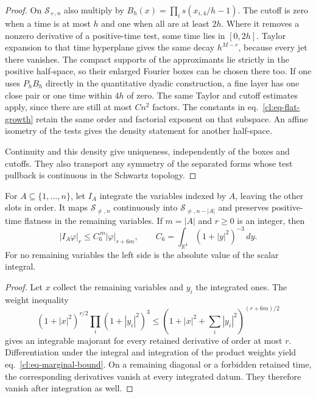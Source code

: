 \documentclass[11pt,letterpaper,reqno]{amsart}
\makeatletter
\numberwithin{equation}{section}
\renewcommand{\eqref}[1]{\textup{eq.~\ref{#1}}}
\theoremstyle{definition}
\newcommand{\ms@minorstart}{%
  \pushQED{\qed}\renewcommand{\qedsymbol}{$\blacksquare$}}
\newenvironment{lemma}[1][]{\ms@minorstart\ms@lemma[#1]}
  {\popQED\endms@lemma}
\theoremstyle{remark}
\makeatother
\begin{document}
\begin{proof}
On \(\mathcal S_{+,n}\) also multiply by
\(B_h(x)=\prod_i s(x_{i,4}/h-1)\).
The cutoff is zero when a time is at most \(h\) and one when
all are at least \(2h\). Where it removes a nonzero derivative
of a positive-time test, some time lies in \([0,2h]\).
Taylor expansion to that time hyperplane gives the same
decay \(h^{M-r}\), because every jet there vanishes.
The compact supports of the approximants lie strictly in
the positive half-space, so their enlarged Fourier boxes
can be chosen there too. If one uses \(P_hB_h\) directly
in the quantitative dyadic construction, a fine layer has
one close pair or one time within \(4h\) of zero.
The same Taylor and cutoff estimates apply, since there
are still at most \(Cn^2\) factors. The constants in
\eqref{cl:eq-flat-growth} retain the same order and factorial
exponent on that subspace. An affine isometry of the tests
gives the density statement for another half-space.

Continuity and this density give uniqueness, independently
of the boxes and cutoffs. They also transport any symmetry
of the separated forms whose test pullback is continuous
in the Schwartz topology.
\end{proof}

\begin{lemma}[Integration of omitted slots]\label{cl:lem-flat-marginal}
For \(A\subseteq\{1,\ldots,n\}\), let \(I_A\) integrate the
variables indexed by \(A\), leaving the other slots in order.
It maps \(\mathcal S_{\ne,n}\) continuously into
\(\mathcal S_{\ne,n-|A|}\) and preserves positive-time
flatness in the remaining variables. If \(m=|A|\) and \(r\ge0\)
is an integer, then
\begin{equation}\label{cl:eq-marginal-bound}
 |I_A\varphi|_r\le C_6^{\,m}|\varphi|_{r+6m},
 \qquad C_6=\int_{\mathbb R^4}(1+|y|^2)^{-3}\,dy.
\end{equation}
For no remaining variables the left side is the absolute value
of the scalar integral.
\end{lemma}

\begin{proof}
Let \(x\) collect the remaining variables and \(y_i\) the
integrated ones. The weight inequality
\[
 (1+|x|^2)^{r/2}\prod_i(1+|y_i|^2)^3
 \le(1+|x|^2+\textstyle\sum_i|y_i|^2)^{(r+6m)/2}
\]
gives an integrable majorant for every retained derivative of
order at most \(r\). Differentiation under the integral and
integration of the product weights yield \eqref{cl:eq-marginal-bound}.
On a remaining diagonal or a forbidden retained time, the
corresponding derivatives vanish at every integrated datum.
They therefore vanish after integration as well.
\end{proof}
\end{document}
